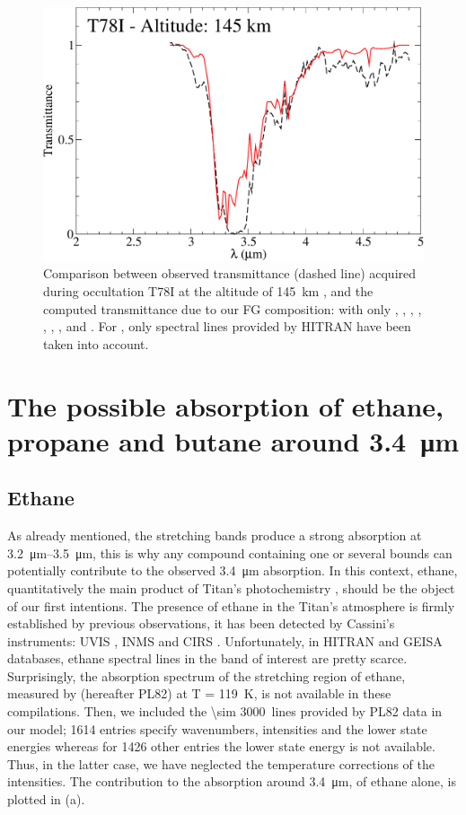\documentclass{arxiv-icarus}
\begin{document}
\begin{figure}[!ht]
    \includegraphics[width=.9\linewidth]{Fig_4}
    \caption{Comparison between observed transmittance (dashed line) acquired during occultation T78I at the
    altitude of \SI{145}{km} \citep{Maltagliati2015}, and the computed transmittance due to our FG composition:
    with only , , , , , , ,  and .
    For , only spectral lines provided by HITRAN have been taken into account.}
    \label{fig:transmit145kmT78I}
\end{figure}


\section{The possible absorption of ethane, propane and butane around \SI{3.4}{\um}}
\label{gases2}

\subsection{Ethane}

As already mentioned, the  stretching bands produce a strong absorption at \SIrange{3.2}{3.5}{\um}, this is why any compound containing one or several  bounds can potentially contribute to the observed \SI{3.4}{\um} absorption. In this context, ethane, quantitatively the main product of Titan's photochemistry \citep{Lavvas2008b,Lavvas2008c,Krasnopolsky2014}, should be the object of our first intentions. The presence of ethane in the Titan's atmosphere is firmly established by previous observations, \eg it has been detected by Cassini's instruments: UVIS \citep{Koskinen2011}, INMS \citep{Cui2009} and CIRS \citep{Vinatier2010a}. Unfortunately, in HITRAN and GEISA databases, ethane spectral lines in the band of interest are pretty scarce. Surprisingly, the absorption spectrum of the  stretching region of ethane, measured by \cite{Pine1982} (hereafter PL82) at T = \SI{119}{K}, is not available in these compilations. Then, we included the \SI{\sim 3000}{lines} provided by PL82 data in our model; \num{1614} entries specify wavenumbers, intensities and the lower state energies whereas for \num{1426} other entries the lower state energy is not available. Thus, in the latter case, we have neglected the temperature corrections of the intensities. The contribution to the absorption around \SI{3.4}{\um}, of ethane alone, is plotted in (a).
\end{document}
